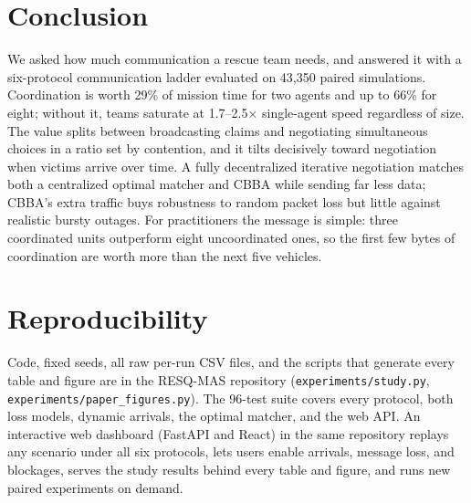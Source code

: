 \documentclass[conference]{IEEEtran}
\begin{document}
\section{Conclusion}
We asked how much communication a rescue team needs, and answered it with a six-protocol communication ladder evaluated on 43,350 paired simulations. Coordination is worth 29\% of mission time for two agents and up to 66\% for eight; without it, teams saturate at 1.7--2.5$\times$ single-agent speed regardless of size. The value splits between broadcasting claims and negotiating simultaneous choices in a ratio set by contention, and it tilts decisively toward negotiation when victims arrive over time. A fully decentralized iterative negotiation matches both a centralized optimal matcher and CBBA while sending far less data; CBBA's extra traffic buys robustness to random packet loss but little against realistic bursty outages. For practitioners the message is simple: three coordinated units outperform eight uncoordinated ones, so the first few bytes of coordination are worth more than the next five vehicles.

\section*{Reproducibility}
Code, fixed seeds, all raw per-run CSV files, and the scripts that generate every table and figure are in the RESQ-MAS repository (\texttt{experiments/study.py}, \texttt{experiments/paper\_figures.py}). The 96-test suite covers every protocol, both loss models, dynamic arrivals, the optimal matcher, and the web API. An interactive web dashboard (FastAPI and React) in the same repository replays any scenario under all six protocols, lets users enable arrivals, message loss, and blockages, serves the study results behind every table and figure, and runs new paired experiments on demand.
\end{document}
